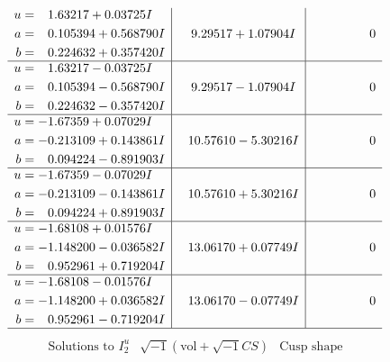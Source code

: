 \documentclass[1p]{elsarticle_modified}
\theoremstyle{definition}
\newcommand{\I}{\sqrt{-1}}
\begin{document}
$$\begin{array}{c|c|c}
\begin{aligned}
u &= \phantom{-}1.63217 + 0.03725 I \\
a &= \phantom{-}0.105394 + 0.568790 I \\
b &= \phantom{-}0.224632 + 0.357420 I\end{aligned}
 & \phantom{-}9.29517 + 1.07904 I & \phantom{-0.000000 } 0 \\ \hline\begin{aligned}
u &= \phantom{-}1.63217 - 0.03725 I \\
a &= \phantom{-}0.105394 - 0.568790 I \\
b &= \phantom{-}0.224632 - 0.357420 I\end{aligned}
 & \phantom{-}9.29517 - 1.07904 I & \phantom{-0.000000 } 0 \\ \hline\begin{aligned}
u &= -1.67359 + 0.07029 I \\
a &= -0.213109 + 0.143861 I \\
b &= \phantom{-}0.094224 - 0.891903 I\end{aligned}
 & \phantom{-}10.57610 - 5.30216 I & \phantom{-0.000000 } 0 \\ \hline\begin{aligned}
u &= -1.67359 - 0.07029 I \\
a &= -0.213109 - 0.143861 I \\
b &= \phantom{-}0.094224 + 0.891903 I\end{aligned}
 & \phantom{-}10.57610 + 5.30216 I & \phantom{-0.000000 } 0 \\ \hline\begin{aligned}
u &= -1.68108 + 0.01576 I \\
a &= -1.148200 - 0.036582 I \\
b &= \phantom{-}0.952961 + 0.719204 I\end{aligned}
 & \phantom{-}13.06170 + 0.07749 I & \phantom{-0.000000 } 0 \\ \hline\begin{aligned}
u &= -1.68108 - 0.01576 I \\
a &= -1.148200 + 0.036582 I \\
b &= \phantom{-}0.952961 - 0.719204 I\end{aligned}
 & \phantom{-}13.06170 - 0.07749 I & \phantom{-0.000000 } 0\\
 \hline 
 \end{array}$$\newpage$$\begin{array}{c|c|c}  
\text{Solutions to }I^u_{2}& \I (\text{vol} + \sqrt{-1}CS) & \text{Cusp shape}\\

\end{array}$$
\end{document}
